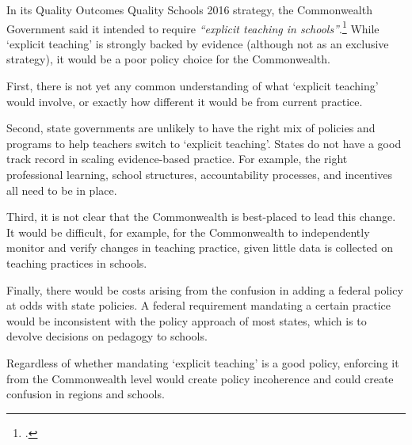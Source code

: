 In its Quality Outcomes Quality Schools 2016 strategy, the Commonwealth Government said it intended to require \textit{``explicit teaching in schools''}.\footcite{2016AustralianGovernmentQualitySchoolsQualityOutcomes} While `explicit teaching' is strongly backed by evidence (although not as an exclusive strategy), it would be a poor policy choice for the Commonwealth.

First, there is not yet any common understanding of what `explicit teaching' would involve, or exactly how different it would be from current practice.

Second, state governments are unlikely to have the right mix of policies and programs to help teachers switch to `explicit teaching'. States do not have a good track record in scaling evidence-based practice. For example, the right professional learning, school structures, accountability processes, and incentives all need to be in place.

Third, it is not clear that the Commonwealth is best-placed to lead this change. It would be difficult, for example, for the Commonwealth to independently monitor and verify changes in teaching practice, given little data is collected on teaching practices in schools.

Finally, there would be costs arising from the confusion in adding a federal policy at odds with state policies. A federal requirement mandating a certain practice would be inconsistent with the policy approach of most states, which is to devolve decisions on pedagogy to schools.

Regardless of whether mandating `explicit teaching' is a good policy, enforcing it from the Commonwealth level would create policy incoherence and could create confusion in regions and schools. 


